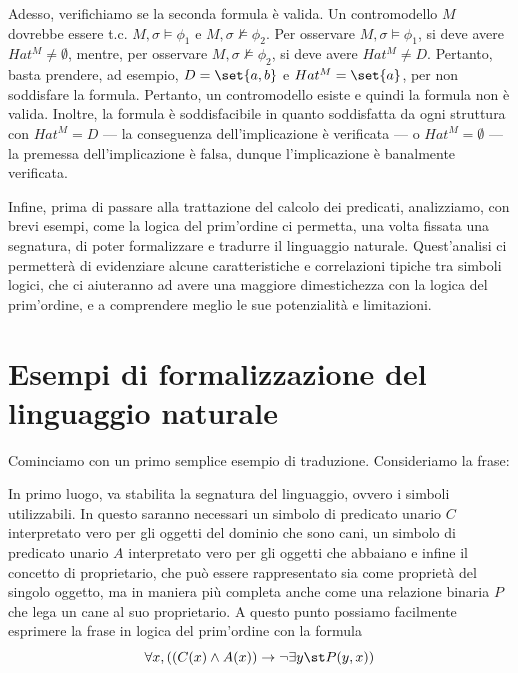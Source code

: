 Adesso, verifichiamo se la seconda formula è valida.
Un contromodello \(M\) dovrebbe essere t.c. \(M,\sigma \models \phi_1\) e \(M,\sigma \not\models \phi_2\).
Per osservare \(M,\sigma \models \phi_1\), si deve avere \(Hat^M \neq \emptyset\), mentre, per osservare \(M,\sigma \not\models \phi_2\), si deve avere \(Hat^M \neq D\).
Pertanto, basta prendere, ad esempio, \(D=\set{a, b}\) e \(Hat^M=\set{a}\), per non soddisfare la formula. Pertanto, un contromodello esiste e quindi la formula non è valida.
Inoltre, la formula è soddisfacibile in quanto soddisfatta da ogni struttura con \(Hat^M=D\) --- la conseguenza dell'implicazione è verificata --- o \(Hat^M=\emptyset\) --- la premessa dell'implicazione è falsa, dunque l'implicazione è banalmente verificata.

Infine, prima di passare alla trattazione del calcolo dei predicati, analizziamo, con brevi esempi, come la logica del prim'ordine ci permetta, una volta fissata una segnatura, di poter formalizzare e tradurre il linguaggio naturale. Quest'analisi ci permetterà di evidenziare alcune caratteristiche e correlazioni tipiche tra simboli logici, che ci aiuteranno ad avere una maggiore dimestichezza con la logica del prim'ordine, e a comprendere meglio le sue potenzialità e limitazioni.

\section{Esempi di formalizzazione del linguaggio naturale}

Cominciamo con un primo semplice esempio di traduzione. Consideriamo la frase:

\begin{quote}
\end{quote}

In primo luogo, va stabilita la segnatura del linguaggio, ovvero i simboli utilizzabili. In questo saranno necessari un simbolo di predicato unario \(C\) interpretato vero per gli oggetti del dominio che sono cani, un simbolo di predicato unario \(A\) interpretato vero per gli oggetti che abbaiano e infine il concetto di proprietario, che può essere rappresentato sia come proprietà del singolo oggetto, ma in maniera più completa anche come una relazione binaria \(P\) che lega un cane al suo proprietario.
A questo punto possiamo facilmente esprimere la frase in logica del prim'ordine con la formula
\[\forall x, ((C(x) \land A(x)) \to \neg\exists y\st P(y,x))\]

